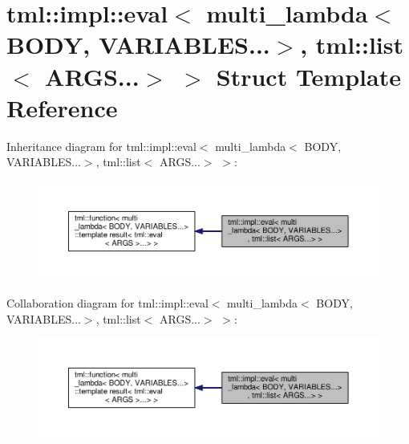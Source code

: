 \hypertarget{structtml_1_1impl_1_1eval_3_01multi__lambda_3_01_b_o_d_y_00_01_v_a_r_i_a_b_l_e_s_8_8_8_4_00_01tm98e6ec09fd21d240cdd6a6f572221376}{\section{tml\+:\+:impl\+:\+:eval$<$ multi\+\_\+lambda$<$ B\+O\+D\+Y, V\+A\+R\+I\+A\+B\+L\+E\+S...$>$, tml\+:\+:list$<$ A\+R\+G\+S...$>$ $>$ Struct Template Reference}
\label{structtml_1_1impl_1_1eval_3_01multi__lambda_3_01_b_o_d_y_00_01_v_a_r_i_a_b_l_e_s_8_8_8_4_00_01tm98e6ec09fd21d240cdd6a6f572221376}
}


Inheritance diagram for tml\+:\+:impl\+:\+:eval$<$ multi\+\_\+lambda$<$ B\+O\+D\+Y, V\+A\+R\+I\+A\+B\+L\+E\+S...$>$, tml\+:\+:list$<$ A\+R\+G\+S...$>$ $>$\+:
\nopagebreak
\begin{figure}[H]
\begin{center}
\leavevmode
\includegraphics[width=350pt]{structtml_1_1impl_1_1eval_3_01multi__lambda_3_01_b_o_d_y_00_01_v_a_r_i_a_b_l_e_s_8_8_8_4_00_01tme8a1abcc0876b7256f2b2d975f092ecd}
\end{center}
\end{figure}


Collaboration diagram for tml\+:\+:impl\+:\+:eval$<$ multi\+\_\+lambda$<$ B\+O\+D\+Y, V\+A\+R\+I\+A\+B\+L\+E\+S...$>$, tml\+:\+:list$<$ A\+R\+G\+S...$>$ $>$\+:
\nopagebreak
\begin{figure}[H]
\begin{center}
\leavevmode
\includegraphics[width=350pt]{structtml_1_1impl_1_1eval_3_01multi__lambda_3_01_b_o_d_y_00_01_v_a_r_i_a_b_l_e_s_8_8_8_4_00_01tm8f2707efc33ca82f62dbea24dda9eca8}
\end{center}
\end{figure}
